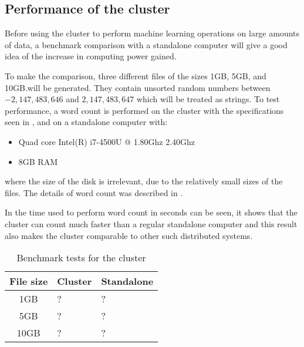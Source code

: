 \subsection{Performance of the cluster}\label{sec:benchmark}
Before using the cluster to perform machine learning operations on large amounts of data, a benchmark comparison with a standalone computer will give a good idea of the increase in computing power gained.

To make the comparison, three different files of the sizes 1GB, 5GB, and 10GB.\@ will be generated. They contain unsorted random numbers between $-2,147,483,646$ and $2,147,483,647$ which will be treated as strings. To test performance, a word count is performed on the cluster with the specifications seen in , and on a standalone computer with:
\begin{itemize}
\item Quad core Intel(R) i7-4500U @ 1.80Ghz 2.40Ghz
\item 8GB RAM
\end{itemize}
where the size of the disk is irrelevant, due to the relatively small sizes of the files. The details of word count was described in .

In  the time used to perform word count in seconds can be seen, it shows that the cluster can count much faster than a regular standalone computer and this result also makes the cluster comparable to other such distributed systems.

\begin{table}[!htb]
  \centering
  \begin{tabular}{|c|ll|}
    \hline
    File size & Cluster  & Standalone \\
    \hline
    1GB & ? & ? \\
    5GB & ? & ? \\
    10GB & ? & ? \\
    \hline
  \end{tabular}
  \caption{Benchmark tests for the cluster}
  \label{tab:bench}
\end{table}

